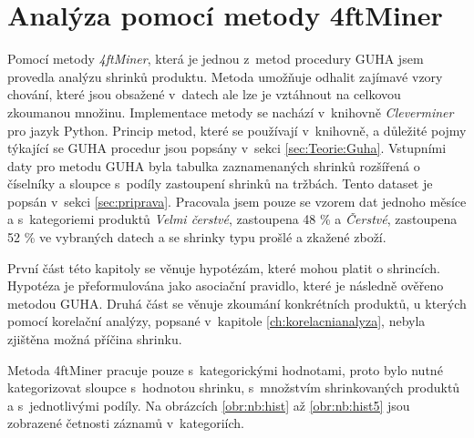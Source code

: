 \chapter{Analýza pomocí metody 4ftMiner}
\label{ch:cleverminer}

Pomocí metody \emph{4ftMiner}, která je jednou z~metod procedury GUHA jsem provedla analýzu shrinků produktu. Metoda umožňuje odhalit zajímavé vzory chování, které jsou obsažené v~datech ale lze je vztáhnout na celkovou zkoumanou množinu. Implementace metody se nachází v~knihovně \emph{Cleverminer} pro jazyk Python. Princip metod, které se používají v~knihovně, a důležité pojmy týkající se GUHA procedur jsou popsány v~sekci \ref*{sec:Teorie:Guha}. Vstupními daty pro metodu GUHA byla tabulka zaznamenaných shrinků rozšířená o číselníky a sloupce s~podíly zastoupení shrinků na tržbách. Tento dataset je popsán v~sekci \ref{sec:priprava}.
Pracovala jsem pouze se vzorem dat jednoho měsíce a s~kategoriemi produktů \emph{Velmi čerstvé}, zastoupena 48 \% a \emph{Čerstvé}, zastoupena 52 \% ve vybraných datech a se shrinky typu prošlé a zkažené zboží. 

První část této kapitoly se věnuje hypotézám, které mohou platit o shrincích. Hypotéza je přeformulována jako asociační pravidlo, které je následně ověřeno metodou GUHA. Druhá část se věnuje zkoumání konkrétních produktů, u kterých pomocí korelační analýzy, popsané v~kapitole \ref*{ch:korelacnianalyza}, nebyla zjištěna možná příčina shrinku.

Metoda 4ftMiner pracuje pouze s~kategorickými hodnotami, proto bylo nutné kategorizovat sloupce s~hodnotou shrinku, s~množstvím shrinkovaných produktů a s~jednotlivými podíly. Na obrázcích \ref*{obr:nb:hist} až \ref{obr:nb:hist5} jsou zobrazené četnosti záznamů v~kategoriích.


